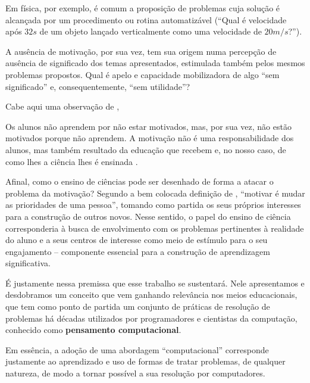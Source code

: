 Em física, por exemplo, é comum a proposição de problemas cuja solução é alcançada por um procedimento ou rotina automatizável (``Qual é velocidade após $32s$ de um objeto lançado verticalmente como uma velocidade de $20m/s$?''). 

A ausência de motivação, por sua vez, tem sua origem numa percepção de ausência de significado dos temas apresentados, estimulada também pelos mesmos problemas propostos. Qual é apelo e capacidade mobilizadora de algo ``sem significado'' e, consequentemente, ``sem utilidade''? 

Cabe aqui uma observação de ,

\begin{citacao}
Os alunos não aprendem por não estar motivados, mas, por sua vez, não estão motivados porque não aprendem. A motivação não é uma responsabilidade dos alunos, mas também resultado da educação que recebem e, no nosso caso, de como lhes a ciência lhes é ensinada \cite{Pozo}.
\end{citacao}

Afinal, como o ensino de ciências pode ser desenhado de forma a atacar o problema da motivação? Segundo a bem colocada definição de , ``motivar é mudar as prioridades de uma pessoa'', tomando como partida os seus próprios interesses para a construção de outros novos. Nesse sentido, o papel do ensino de ciência corresponderia à busca de envolvimento com os problemas pertinentes à realidade do aluno e a seus centros de interesse como meio de estímulo para o seu engajamento -- componente essencial para a construção de aprendizagem significativa. 

É justamente nessa premissa que esse trabalho se sustentará. Nele apresentamos e desdobramos um conceito que vem ganhando relevância nos meios educacionais, que tem como ponto de partida um conjunto de práticas de resolução de problemas há décadas utilizados por programadores e cientistas da computação, conhecido como \textbf{pensamento computacional}.

Em essência, a adoção de uma abordagem ``computacional'' corresponde justamente ao aprendizado e uso de formas de tratar problemas, de qualquer natureza, de modo a tornar possível a sua resolução por computadores.







